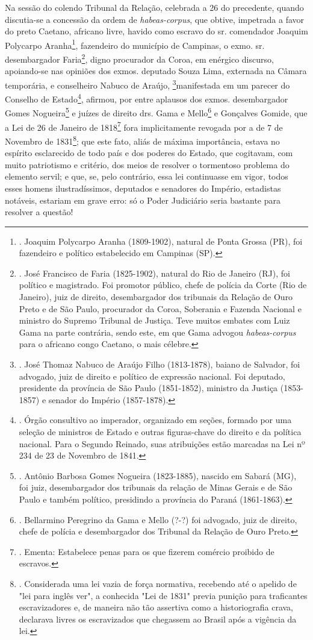 Na sessão do colendo Tribunal da Relação, celebrada a 26 do precedente,
quando discutia-se a concessão da ordem de \emph{habeas-corpus}, que
obtive, impetrada a favor do preto Caetano, africano livre, havido como
escravo do sr. comendador Joaquim Polycarpo Aranha\footnote{. Joaquim
  Polycarpo Aranha (1809-1902), natural de Ponta Grossa (PR), foi
  fazendeiro e político estabelecido em Campinas (SP).}, fazendeiro do
município de Campinas, o exmo. sr. desembargador Faria\footnote{. José
  Francisco de Faria (1825-1902), natural do Rio de Janeiro (RJ), foi
  político e magistrado. Foi promotor público, chefe de polícia da Corte
  (Rio de Janeiro), juiz de direito, desembargador dos tribunais da
  Relação de Ouro Preto e de São Paulo, procurador da Coroa, Soberania e
  Fazenda Nacional e ministro do Supremo Tribunal de Justiça. Teve
  muitos embates com Luiz Gama na parte contrária, sendo este, em que
  Gama advogou \emph{habeas-corpus} para o africano congo Caetano, o
  mais célebre.}, digno procurador da Coroa, em enérgico discurso,
apoiando-se nas opiniões dos exmos. deputado Souza Lima, externada na
Câmara temporária, e conselheiro Nabuco de Araújo, \footnote{. José
  Thomaz Nabuco de Araújo Filho (1813-1878), baiano de Salvador, foi
  advogado, juiz de direito e político de expressão nacional. Foi
  deputado, presidente da província de São Paulo (1851-1852), ministro
  da Justiça (1853-1857) e senador do Império (1857-1878).}manifestada
em um parecer do Conselho de Estado\footnote{. Órgão consultivo ao
  imperador, organizado em seções, formado por uma seleção de ministros
  de Estado e outras figuras-chave do direito e da política nacional.
  Para o Segundo Reinado, suas atribuições estão marcadas na Lei nº 234
  de 23 de Novembro de 1841.}, afirmou, por entre aplausos dos exmos.
desembargador Gomes Nogueira\footnote{. Antônio Barbosa Gomes Nogueira
  (1823-1885), nascido em Sabará (MG), foi juiz, desembargador dos
  tribunais da relação de Minas Gerais e de São Paulo e também político,
  presidindo a província do Paraná (1861-1863).} e juízes de direito
drs. Gama e Mello\footnote{. Bellarmino Peregrino da Gama e Mello (?-?)
  foi advogado, juiz de direito, chefe de polícia e desembargador dos
  Tribunal da Relação de Ouro Preto.} e Gonçalves Gomide, que a Lei de
26 de Janeiro de 1818\footnote{. Ementa: Estabelece penas para os que
  fizerem comércio proibido de escravos.} fora implicitamente revogada
por a de 7 de Novembro de 1831\footnote{. Considerada uma lei vazia de
  força normativa, recebendo até o apelido de "lei para inglês ver", a
  conhecida "Lei de 1831" previa punição para traficantes escravizadores
  e, de maneira não tão assertiva como a historiografia crava, declarava
  livres os escravizados que chegassem ao Brasil após a vigência da lei.};
que este fato, aliás de máxima importância, estava no espírito
esclarecido de todo país e dos poderes do Estado, que cogitavam, com
muito patriotismo e critério, dos meios de resolver o tormentoso
problema do elemento servil; e que, se, pelo contrário, essa lei
continuasse em vigor, todos esses homens ilustradíssimos, deputados e
senadores do Império, estadistas notáveis, estariam em grave erro: só o
Poder Judiciário seria bastante para resolver a questão!

